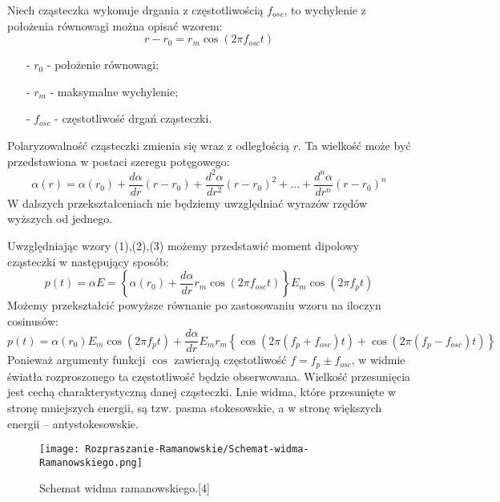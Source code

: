 Niech cząsteczka wykonuje drgania z częstotliwością $f_{osc}$, to wychylenie z położenia 
równowagi można opisać wzorem:
\begin{equation}
	r - r_{0} = r_{m}\cos (2\pi f_{osc}t)
\end{equation}
\begin{itemize}
	\item[-]{$r_{0}$ - położenie równowagi};
	\item[-]{$r_{m}$ - maksymalne wychylenie};
	\item[-]{$f_{osc}$ - częstotliwość drgań cząsteczki}.
\end{itemize}
Polaryzowalność cząsteczki zmienia się wraz z odległością $r$. Ta wielkość może być
przedstawiona w postaci szeregu potęgowego:
\begin{equation}
	\alpha(r) = \alpha(r_{0}) + \frac{d\alpha}{dr}(r - r_{0}) + 
	\frac{d^{2}\alpha}{dr^{2}}(r - r_{0})^{2} + ... +
	\frac{d^{n}\alpha}{dr^{n}}(r - r_{0})^{n}
\end{equation}
W dalszych przekształceniach nie będziemy uwzględniać wyrazów rzędów wyższych od jednego. 

Uwzględniając wzory (1),(2),(3) możemy przedstawić moment dipolowy cząsteczki w następujący
sposób:
\begin{equation}
	p(t) = \alpha E = 
	\left\{ 
		\alpha(r_{0}) + \frac{d\alpha}{dr}r_{m}\cos (2\pi f_{osc}t) 
	\right\}
	E_{m}\cos (2\pi f_{p}t)
\end{equation}
Możemy przekształcić powyższe równanie po zastosowaniu wzoru na iloczyn cosinusów:
\begin{equation}
	p(t) = \alpha(r_{0})E_{m}\cos (2\pi f_{p}t) + \frac{d\alpha}{dr}E_{m}r_{m}
	\left\{
		\cos (2\pi (f_{p} + f_{osc})t) + \cos (2\pi (f_{p} - f_{osc})t)
	 \right\}
\end{equation}
Ponieważ argumenty funkcji $\cos$ zawierają częstotliwość $f = f_{p} \pm f_{osc}$, w widmie światła
rozproszonego ta częstotliwość będzie obserwowana. Wielkość przesunięcia jest cechą charakterystyczną danej cząsteczki. Lnie widma, które przesunięte w stronę mniejszych energii, są tzw. pasma stokesowskie, a w stronę większych energii – antystokesowskie.
\begin{figure}[H]
	\begin{center}
		\texttt{[image: Rozpraszanie-Ramanowskie/Schemat-widma-Ramanowskiego.png]}
		\caption{Schemat widma ramanowskiego.[4]}
	\end{center}
\end{figure}

